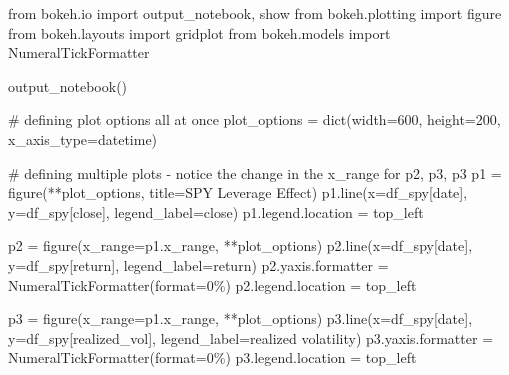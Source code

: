 \documentclass[
  letterpaper,
  DIV=11,
  numbers=noendperiod]{scrreprt}
\newenvironment{Shaded}{\begin{snugshade}}{\end{snugshade}}
\newcommand{\BuiltInTok}[1]{\textcolor[rgb]{0.00,0.23,0.31}{#1}}
\newcommand{\CommentTok}[1]{\textcolor[rgb]{0.37,0.37,0.37}{#1}}
\newcommand{\DecValTok}[1]{\textcolor[rgb]{0.68,0.00,0.00}{#1}}
\newcommand{\ImportTok}[1]{\textcolor[rgb]{0.00,0.46,0.62}{#1}}
\newcommand{\NormalTok}[1]{\textcolor[rgb]{0.00,0.23,0.31}{#1}}
\newcommand{\OperatorTok}[1]{\textcolor[rgb]{0.37,0.37,0.37}{#1}}
\newcommand{\StringTok}[1]{\textcolor[rgb]{0.13,0.47,0.30}{#1}}
\begin{document}
\begin{Shaded}
\begin{Highlighting}[]
\ImportTok{from}\NormalTok{ bokeh.io }\ImportTok{import}\NormalTok{ output\_notebook, show}
\ImportTok{from}\NormalTok{ bokeh.plotting }\ImportTok{import}\NormalTok{ figure}
\ImportTok{from}\NormalTok{ bokeh.layouts }\ImportTok{import}\NormalTok{ gridplot}
\ImportTok{from}\NormalTok{ bokeh.models }\ImportTok{import}\NormalTok{ NumeralTickFormatter}

\NormalTok{output\_notebook()}

\CommentTok{\# defining plot options all at once}
\NormalTok{plot\_options }\OperatorTok{=} \BuiltInTok{dict}\NormalTok{(width}\OperatorTok{=}\DecValTok{600}\NormalTok{, height}\OperatorTok{=}\DecValTok{200}\NormalTok{, x\_axis\_type}\OperatorTok{=}\StringTok{\textquotesingle{}datetime\textquotesingle{}}\NormalTok{)}

\CommentTok{\# defining multiple plots {-} notice the change in the x\_range for p2, p3, p3}
\NormalTok{p1 }\OperatorTok{=}\NormalTok{ figure(}\OperatorTok{**}\NormalTok{plot\_options, title}\OperatorTok{=}\StringTok{\textquotesingle{}SPY Leverage Effect\textquotesingle{}}\NormalTok{)}
\NormalTok{p1.line(x}\OperatorTok{=}\NormalTok{df\_spy[}\StringTok{\textquotesingle{}date\textquotesingle{}}\NormalTok{], y}\OperatorTok{=}\NormalTok{df\_spy[}\StringTok{\textquotesingle{}close\textquotesingle{}}\NormalTok{], legend\_label}\OperatorTok{=}\StringTok{\textquotesingle{}close\textquotesingle{}}\NormalTok{)}
\NormalTok{p1.legend.location }\OperatorTok{=} \StringTok{\textquotesingle{}top\_left\textquotesingle{}}

\NormalTok{p2 }\OperatorTok{=}\NormalTok{ figure(x\_range}\OperatorTok{=}\NormalTok{p1.x\_range,  }\OperatorTok{**}\NormalTok{plot\_options)}
\NormalTok{p2.line(x}\OperatorTok{=}\NormalTok{df\_spy[}\StringTok{\textquotesingle{}date\textquotesingle{}}\NormalTok{], y}\OperatorTok{=}\NormalTok{df\_spy[}\StringTok{\textquotesingle{}return\textquotesingle{}}\NormalTok{], legend\_label}\OperatorTok{=}\StringTok{\textquotesingle{}return\textquotesingle{}}\NormalTok{)}
\NormalTok{p2.yaxis.formatter }\OperatorTok{=}\NormalTok{ NumeralTickFormatter(}\BuiltInTok{format}\OperatorTok{=}\StringTok{\textquotesingle{}0\%\textquotesingle{}}\NormalTok{)}
\NormalTok{p2.legend.location }\OperatorTok{=} \StringTok{\textquotesingle{}top\_left\textquotesingle{}}

\NormalTok{p3 }\OperatorTok{=}\NormalTok{ figure(x\_range}\OperatorTok{=}\NormalTok{p1.x\_range, }\OperatorTok{**}\NormalTok{plot\_options)}
\NormalTok{p3.line(x}\OperatorTok{=}\NormalTok{df\_spy[}\StringTok{\textquotesingle{}date\textquotesingle{}}\NormalTok{], y}\OperatorTok{=}\NormalTok{df\_spy[}\StringTok{\textquotesingle{}realized\_vol\textquotesingle{}}\NormalTok{], legend\_label}\OperatorTok{=}\StringTok{\textquotesingle{}realized volatility\textquotesingle{}}\NormalTok{)}
\NormalTok{p3.yaxis.formatter }\OperatorTok{=}\NormalTok{ NumeralTickFormatter(}\BuiltInTok{format}\OperatorTok{=}\StringTok{\textquotesingle{}0\%\textquotesingle{}}\NormalTok{)}
\NormalTok{p3.legend.location }\OperatorTok{=} \StringTok{\textquotesingle{}top\_left\textquotesingle{}}


\end{Highlighting}
\end{Shaded}
\end{document}
